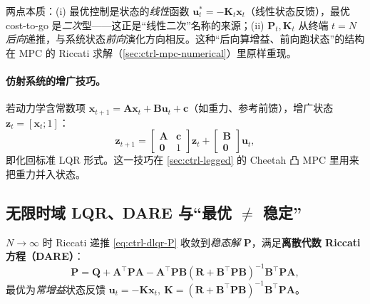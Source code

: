 \begin{insight}
两点本质：(i) 最优控制是状态的\emph{线性}函数 $\mathbf{u}_t^*=-\mathbf{K}_t\mathbf{x}_t$（线性状态反馈），最优 cost-to-go 是\emph{二次}型——这正是“线性二次”名称的来源；(ii) $\mathbf{P}_t,\mathbf{K}_t$ 从终端 $t=N$ \emph{后向}递推，与系统状态\emph{前向}演化方向相反。这种“后向算增益、前向跑状态”的结构在 MPC 的 Riccati 求解（\cref{sec:ctrl-mpc-numerical}）里原样重现。
\end{insight}

\paragraph{仿射系统的增广技巧。}
若动力学含常数项 $\mathbf{x}_{t+1}=\mathbf{A}\mathbf{x}_t+\mathbf{B}\mathbf{u}_t+\mathbf{c}$（如重力、参考前馈），增广状态 $\mathbf{z}_t=[\mathbf{x}_t;1]$\cite{bansal2017lqr}：
\begin{equation}
  \mathbf{z}_{t+1}=\begin{bmatrix}\mathbf{A}&\mathbf{c}\\\mathbf{0}&1\end{bmatrix}\mathbf{z}_t+\begin{bmatrix}\mathbf{B}\\\mathbf{0}\end{bmatrix}\mathbf{u}_t,
  \label{eq:ctrl-affine}
\end{equation}
即化回标准 LQR 形式。这一技巧在 \cref{sec:ctrl-legged} 的 Cheetah 凸 MPC 里用来把重力并入状态。

\subsection{无限时域 LQR、DARE 与“最优 $\ne$ 稳定”}
\label{sec:ctrl-lqr-dare}

$N\to\infty$ 时 Riccati 递推 \cref{eq:ctrl-dlqr-P} 收敛到\emph{稳态解} $\mathbf{P}$，满足\textbf{离散代数 Riccati 方程（DARE）}\cite{bansal2017lqr,rawlings2020mpc}：
\begin{equation}
  \boxed{\mathbf{P}=\mathbf{Q}+\mathbf{A}^\top\mathbf{P}\mathbf{A}-\mathbf{A}^\top\mathbf{P}\mathbf{B}(\mathbf{R}+\mathbf{B}^\top\mathbf{P}\mathbf{B})^{-1}\mathbf{B}^\top\mathbf{P}\mathbf{A},}
  \label{eq:ctrl-dare}
\end{equation}
最优为\emph{常增益}状态反馈 $\mathbf{u}_t=-\mathbf{K}\mathbf{x}_t,\ \mathbf{K}=(\mathbf{R}+\mathbf{B}^\top\mathbf{P}\mathbf{B})^{-1}\mathbf{B}^\top\mathbf{P}\mathbf{A}$。

